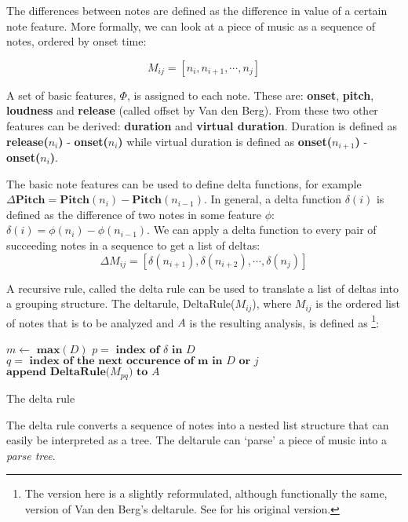 \documentclass[a4paper,10pt]{article}
\begin{document}
The differences between notes are defined as the difference in value of a certain note feature. More formally, we can look at a piece of music as a sequence of notes, ordered by onset time:

\[M_{ij} = [n_i, n_{i+1}, \cdots, n_j]\]

A set of basic features, $\Phi$, is assigned to each note. These are: \textbf{onset}, \textbf{pitch}, \textbf{loudness} and \textbf{release} (called offset by Van den Berg). From these two other features can be derived: \textbf{duration} and \textbf{virtual duration}. Duration is defined as \textbf{release($n_i$)} - \textbf{onset($n_i$)} while virtual duration is defined as \textbf{onset($n_{i+1}$)} - \textbf{onset($n_i$)}. 

The basic note features can be used to define delta functions, for example $\Delta\textbf{Pitch} = \textbf{Pitch}(n_i) - \textbf{Pitch}(n_{i-1})$. In general, a delta function $\delta(i)$ is defined as the difference of two notes in some feature $\phi$: $\delta(i) = \phi(n_i) - \phi(n_{i-1})$. We can apply a delta function to every pair of succeeding notes in a sequence to get a list of deltas: 
\[\Delta M_{ij} = [\delta(n_{i+1}), \delta(n_{i+2}), \cdots, \delta(n_{j})]\]

A recursive rule, called the delta rule can be used to translate a list of deltas into a grouping structure. The deltarule, DeltaRule($M_{ij}$), where $M_{ij}$ is the ordered list of notes that is to be analyzed and $A$ is the resulting analysis, is defined as \footnote{The version here is a slightly reformulated, although functionally the same, version of Van den Berg's deltarule. See \cite{markwin} for his original version.}:
\begin{algorithm}
\begin{algorithmic}
\STATE $m \leftarrow \textbf{ max}(D)$
\STATE $p = \textbf{ index of }\delta \textbf{ in } D$
\STATE $q = \textbf{ index of the next occurence of m in }D \textbf{ or } j$
\STATE $\textbf{append DeltaRule(}M_{pq}\textbf{) to } A$
\ENDIF
\ENDFOR
{}
\end{algorithmic}
\caption{The delta rule}
\label{deltarule}
\end{algorithm}

The delta rule converts a sequence of notes into a nested list structure that can easily be interpreted as a tree. The deltarule can `parse' a piece of music into a \textit{parse tree}.
\end{document}
